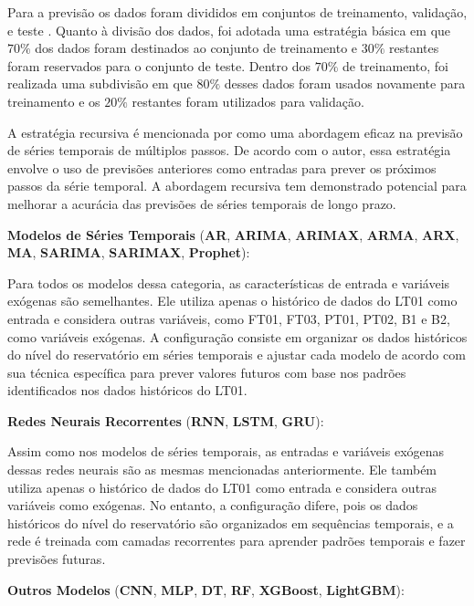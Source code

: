 Para a previsão os dados foram divididos em conjuntos de treinamento, validação, e teste \cite{raschka2015practical, geron2017hands_on}. Quanto à divisão dos dados, foi adotada uma estratégia básica em que $70\%$ dos dados foram destinados ao conjunto de treinamento e $30\%$ restantes foram reservados para o conjunto de teste. Dentro dos $70\%$ de treinamento, foi realizada uma subdivisão em que $80\%$ desses dados foram usados novamente para treinamento e os $20\%$ restantes foram utilizados para validação. 

A estratégia recursiva é mencionada por  como uma abordagem eficaz na previsão de séries temporais de múltiplos passos. De acordo com o autor, essa estratégia envolve o uso de previsões anteriores como entradas para prever os próximos passos da série temporal. A abordagem recursiva tem demonstrado potencial para melhorar a acurácia das previsões de séries temporais de longo prazo.


\noindent\textbf{Modelos de Séries Temporais} (\textbf{AR}, \textbf{ARIMA}, \textbf{ARIMAX}, \textbf{ARMA}, \textbf{ARX}, \textbf{MA}, \textbf{SARIMA}, \textbf{SARIMAX}, \textbf{Prophet}):

Para todos os modelos dessa categoria, as características de entrada e variáveis exógenas são semelhantes. Ele utiliza apenas o histórico de dados do LT01 como entrada e considera outras variáveis, como FT01, FT03, PT01, PT02, B1 e B2, como variáveis exógenas. A configuração consiste em organizar os dados históricos do nível do reservatório em séries temporais e ajustar cada modelo de acordo com sua técnica específica para prever valores futuros com base nos padrões identificados nos dados históricos do LT01.

\noindent\textbf{Redes Neurais Recorrentes} (\textbf{RNN}, \textbf{LSTM}, \textbf{GRU}):

Assim como nos modelos de séries temporais, as entradas e variáveis exógenas dessas redes neurais são as mesmas mencionadas anteriormente. Ele também utiliza apenas o histórico de dados do LT01 como entrada e considera outras variáveis como exógenas. No entanto, a configuração difere, pois os dados históricos do nível do reservatório são organizados em sequências temporais, e a rede é treinada com camadas recorrentes para aprender padrões temporais e fazer previsões futuras.

\noindent\textbf{Outros Modelos} (\textbf{CNN}, \textbf{MLP}, \textbf{DT}, \textbf{RF}, \textbf{XGBoost}, \textbf{LightGBM}):


